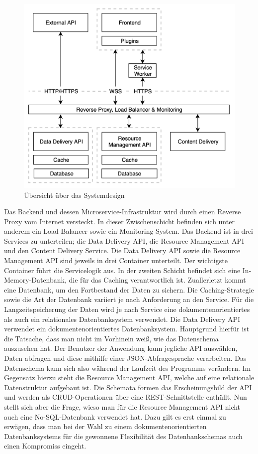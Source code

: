 \begin{figure}
    \begin{center}
    \includegraphics[scale=0.2]{img/abbildungen/MicroserviceInfrastruktur}
    \end{center}
    \caption{Übersicht über das Systemdesign}
    \label{figure:uebersichtueberdassystemdesign}
\end{figure}

Das Backend und dessen Microservice-Infrastruktur wird durch einen Reverse Proxy vom Internet versteckt.
In dieser Zwischenschicht befinden sich unter anderem ein Load Balancer sowie ein Monitoring System.
Das Backend ist in drei Services zu unterteilen; die Data Delivery API, die Resource Management API
und den Content Delivery Service. Die Data Delivery API sowie die Resource Management API sind jeweils
in drei Container unterteilt. Der wichtigste Container führt die Servicelogik aus. In der zweiten
Schicht befindet sich eine In-Memory-Datenbank, die für das Caching verantwortlich ist. Zuallerletzt
kommt eine Datenbank, um den Fortbestand der Daten zu sichern. Die Caching-Strategie sowie die Art der
Datenbank variiert je nach Anforderung an den Service. Für die Langzeitspeicherung der Daten wird je nach Service
eine dokumentenorientiertes als auch ein relationales Datenbanksystem verwendet. Die Data Delivery API
verwendet ein dokumentenorientiertes Datenbanksystem. Hauptgrund hierfür ist die Tatsache, dass man nicht
im Vorhinein weiß, wie das Datenschema auszusehen hat. Der Benutzer der Anwendung kann jegliche API
auswählen, Daten abfragen und diese mithilfe einer JSON-Abfragesprache verarbeiten. Das Datenschema
kann sich also während der Laufzeit des Programms verändern. Im Gegensatz hierzu steht die Resource
Management API, welche auf eine relationale Datenstruktur aufgebaut ist. Die Schemata formen das
Erscheinungsbild der API und werden als CRUD-Operationen über eine REST-Schnittstelle enthüllt.
Nun stellt sich aber die Frage, wieso man für die Resource Management API nicht auch eine
No-SQL-Datenbank verwendet hat. Dazu gilt es erst einmal zu erwägen, dass man bei der Wahl zu
einem dokumentenorientierten Datenbanksystems für die gewonnene Flexibilität des Datenbankschemas
auch einen Kompromiss eingeht.


